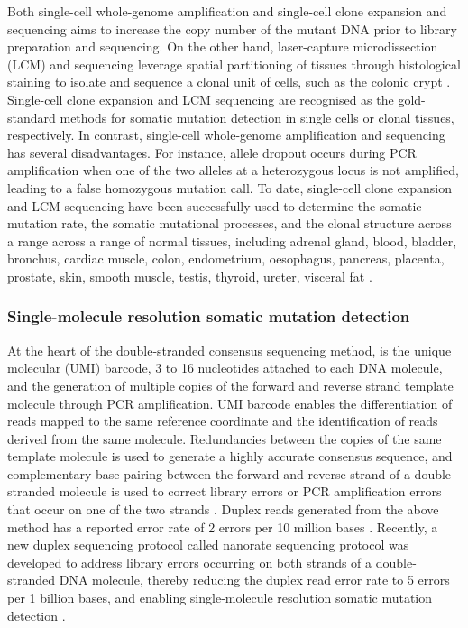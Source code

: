 Both single-cell whole-genome amplification \cite{Lodato2018-hh} and single-cell clone expansion and sequencing \cite{Lee-Six2018-qe, MSpencer_Chapman2021-cq} aims to increase the copy number of the mutant DNA prior to library preparation and sequencing. On the other hand, laser-capture microdissection (LCM) and sequencing leverage spatial partitioning of tissues through histological staining to isolate and sequence a clonal unit of cells, such as the colonic crypt \cite{Ellis2021-it}. Single-cell clone expansion and LCM sequencing are recognised as the gold-standard methods for somatic mutation detection in single cells or clonal tissues, respectively. In contrast, single-cell whole-genome amplification and sequencing has several disadvantages. For instance, allele dropout occurs during PCR amplification when one of the two alleles at a heterozygous locus is not amplified, leading to a false homozygous mutation call. To date, single-cell clone expansion and LCM sequencing have been successfully used to determine the somatic mutation rate, the somatic mutational processes, and the clonal structure across a range across a range of normal tissues, including adrenal gland, blood, bladder, bronchus, cardiac muscle, colon, endometrium, oesophagus, pancreas, placenta, prostate, skin, smooth muscle, testis, thyroid, ureter, visceral fat \cite{Lee-Six2018-qe, MSpencer_Chapman2021-cq, Martincorena2015-gu, Ju2017-vw, Martincorena2018-av, Brunner2019-xg, Lee-Six2019-vt, Yoshida2020-yr, Olafsson2020-vi, Moore2020-pi, Lawson2020-em, Coorens2021-ct, Robinson2021-te, Grossmann2021-gd, Moore2021-dl, Park2021-fx, Ng2021-jd, Mitchell2022-ry}. 

\subsubsection{Single-molecule resolution somatic mutation detection}

At the heart of the double-stranded consensus sequencing method, is the unique molecular (UMI) barcode, 3 to 16 nucleotides attached to each DNA molecule, and the generation of multiple copies of the forward and reverse strand template molecule through PCR amplification. UMI barcode enables the differentiation of reads mapped to the same reference coordinate and the identification of reads derived from the same molecule. Redundancies between the copies of the same template molecule is used to generate a highly accurate consensus sequence, and complementary base pairing between the forward and reverse strand of a double-stranded molecule is used to correct library errors or PCR amplification errors that occur on one of the two strands \cite{Schmitt2012-yr, Hoang2016-jx, Abascal2021-pk}. Duplex reads generated from the above method has a reported error rate of 2 errors per 10 million bases \cite{Schmitt2012-yr}. Recently, a new duplex sequencing protocol called nanorate sequencing protocol was developed to address library errors occurring on both strands of a double-stranded DNA molecule, thereby reducing the duplex read error rate to 5 errors per 1 billion bases, and enabling single-molecule resolution somatic mutation detection \cite{Abascal2021-pk}.

